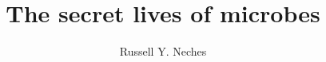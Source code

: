 \documentclass[PhD]{ucdavisthesis}
\title{The secret lives of microbes}
\author{Russell Y. Neches}
\begin{document}
\makeintropages

%
%
%
%


\end{document}

